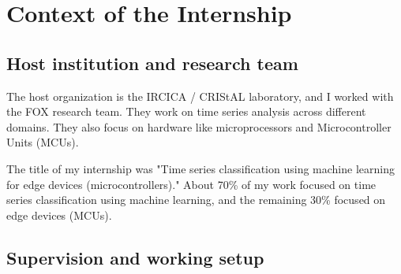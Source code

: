 %

\section{Context of the Internship}
\label{sec:context}


\subsection{Host institution and research team}


The host organization is the IRCICA / CRIStAL laboratory, and I worked with the FOX research team. They work on time series analysis across different domains. They also focus on hardware like microprocessors and Microcontroller Units (MCUs).


The title of my internship was "Time series classification using machine learning for edge devices (microcontrollers)." About 70\% of my work focused on time series classification using machine learning, and the remaining 30\% focused on edge devices (MCUs).

\subsection{Supervision and working setup}

